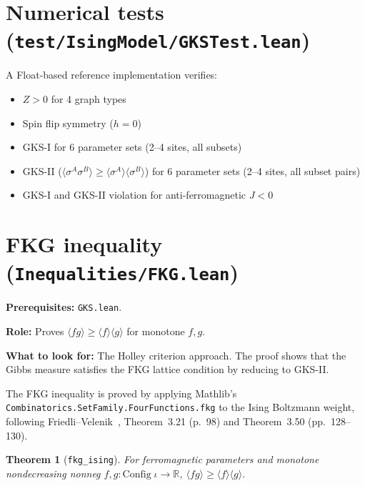 \documentclass[a4paper,11pt]{article}
\newtheorem{theorem}{Theorem}
\begin{document}
\section{Numerical tests (\texttt{test/IsingModel/GKSTest.lean})}

A Float-based reference implementation verifies:
\begin{itemize}
  \item $Z > 0$ for 4 graph types
  \item Spin flip symmetry ($h = 0$)
  \item GKS-I for 6 parameter sets (2--4 sites, all subsets)
  \item GKS-II ($\langle\sigma^A\sigma^B\rangle \geq
    \langle\sigma^A\rangle\langle\sigma^B\rangle$)
    for 6 parameter sets (2--4 sites, all subset pairs)
  \item GKS-I and GKS-II violation for anti-ferromagnetic $J < 0$
\end{itemize}

\section{FKG inequality (\texttt{Inequalities/FKG.lean})}

\par\noindent\textbf{Prerequisites:} \texttt{GKS.lean}.

\textbf{Role:} Proves $\langle fg \rangle \ge \langle f \rangle\langle g \rangle$
for monotone $f, g$.

\textbf{What to look for:} The Holley criterion approach. The proof
shows that the Gibbs measure satisfies the FKG lattice condition
by reducing to GKS-II.

The FKG inequality is proved by applying Mathlib's
\texttt{Combinatorics.\allowbreak SetFamily.\allowbreak FourFunctions.\allowbreak fkg}
to the Ising Boltzmann weight, following
Friedli--Velenik~\cite{friedli-velenik}, Theorem~3.21
(p.~98) and Theorem~3.50 (pp.~128--130).

\begin{theorem}[\texttt{fkg\_ising}]
For ferromagnetic parameters and monotone nondecreasing nonneg
$f, g : \mathrm{Config}\;\iota \to \mathbb{R}$,
$\langle fg \rangle \geq \langle f \rangle \langle g \rangle$.
\end{theorem}
\end{document}
